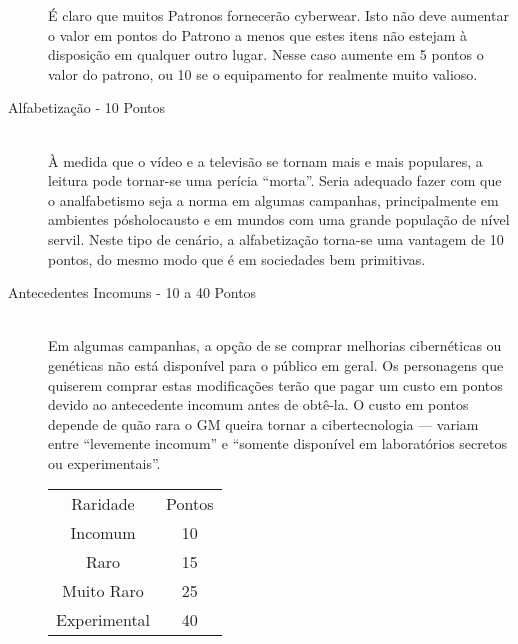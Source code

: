 \documentclass[a4paper]{article}
\begin{document}
\begin{description}
É claro que muitos Patronos fornecerão cyberwear. Isto não deve
aumentar o valor em pontos do Patrono a menos que estes itens não
estejam à disposição em qualquer outro lugar. Nesse caso aumente em
5 pontos o valor do patrono, ou 10 se o equipamento for realmente
muito valioso.
  \item[Alfabetização - 10 Pontos] \hfill \\ À medida que o vídeo e a televisão se tornam mais e mais
populares, a leitura pode tornar-se uma perícia “morta”. Seria
adequado fazer com que o analfabetismo seja a norma em
algumas campanhas, principalmente em ambientes pósholocausto
e em mundos com uma grande população de nível
servil. Neste tipo de cenário, a alfabetização torna-se uma
vantagem de 10 pontos, do mesmo modo que é em sociedades
bem primitivas.
  \item[Antecedentes Incomuns - 10 a 40 Pontos] \hfill \\ Em algumas campanhas, a opção de se comprar melhorias
cibernéticas ou genéticas não está disponível para o público em geral.
Os personagens que quiserem comprar estas modificações terão que
pagar um custo em pontos devido ao antecedente incomum antes de
obtê-la.
O custo em pontos depende de quão rara o GM queira tornar a cibertecnologia
— variam entre “levemente incomum” e “somente disponível
em laboratórios secretos ou experimentais”.
\begin{table}[h]
 \centering
 {\renewcommand\arraystretch{1.25}
 \begin{tabular}{ l l }
  \cline{1-1}\cline{2-2}  
    \multicolumn{1}{|c|}{Raridade \centering } &
    \multicolumn{1}{c|}{Pontos \centering }
  \\  
  \cline{1-1}\cline{2-2}  
    \multicolumn{1}{|c|}{Incomum \centering } &
    \multicolumn{1}{c|}{10 \centering }
  \\  
  \cline{1-1}\cline{2-2}  
    \multicolumn{1}{|c|}{Raro \centering } &
    \multicolumn{1}{c|}{15 \centering }
  \\  
  \cline{1-1}\cline{2-2}  
    \multicolumn{1}{|c|}{Muito Raro \centering } &
    \multicolumn{1}{c|}{25 \centering }
  \\  
  \cline{1-1}\cline{2-2}  
    \multicolumn{1}{|c|}{Experimental \centering } &
    \multicolumn{1}{c|}{40 \centering }
  \\  
  \hline


\end{tabular}}
\end{table}
\end{description}
\end{document}
